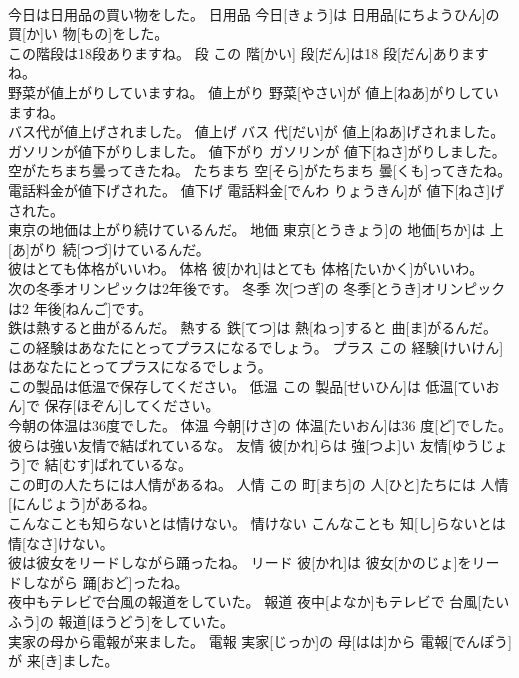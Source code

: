\documentclass[8pt]{extreport}
\begin{document}
\begin{CJK}{UTF8}{min}
\\	今日は日用品の買い物をした。	日用品	今日[きょう]は 日用品[にちようひん]の 買[か]い 物[もの]をした。	
\\	この階段は18段ありますね。	段	この 階[かい] 段[だん]は18 段[だん]ありますね。	
\\	野菜が値上がりしていますね。	値上がり	野菜[やさい]が 値上[ねあ]がりしていますね。	
\\	バス代が値上げされました。	値上げ	バス 代[だい]が 値上[ねあ]げされました。	
\\	ガソリンが値下がりしました。	値下がり	ガソリンが 値下[ねさ]がりしました。	
\\	空がたちまち曇ってきたね。	たちまち	空[そら]がたちまち 曇[くも]ってきたね。	
\\	電話料金が値下げされた。	値下げ	電話料金[でんわ りょうきん]が 値下[ねさ]げされた。	
\\	東京の地価は上がり続けているんだ。	地価	東京[とうきょう]の 地価[ちか]は 上[あ]がり 続[つづ]けているんだ。	
\\	彼はとても体格がいいわ。	体格	彼[かれ]はとても 体格[たいかく]がいいわ。	
\\	次の冬季オリンピックは2年後です。	冬季	次[つぎ]の 冬季[とうき]オリンピックは2 年後[ねんご]です。	
\\	鉄は熱すると曲がるんだ。	熱する	鉄[てつ]は 熱[ねっ]すると 曲[ま]がるんだ。	
\\	この経験はあなたにとってプラスになるでしょう。	プラス	この 経験[けいけん]はあなたにとってプラスになるでしょう。	
\\	この製品は低温で保存してください。	低温	この 製品[せいひん]は 低温[ていおん]で 保存[ほぞん]してください。	
\\	今朝の体温は36度でした。	体温	今朝[けさ]の 体温[たいおん]は36 度[ど]でした。	
\\	彼らは強い友情で結ばれているな。	友情	彼[かれ]らは 強[つよ]い 友情[ゆうじょう]で 結[むす]ばれているな。	
\\	この町の人たちには人情があるね。	人情	この 町[まち]の 人[ひと]たちには 人情[にんじょう]があるね。	
\\	こんなことも知らないとは情けない。	情けない	こんなことも 知[し]らないとは 情[なさ]けない。	
\\	彼は彼女をリードしながら踊ったね。	リード	彼[かれ]は 彼女[かのじょ]をリードしながら 踊[おど]ったね。	
\\	夜中もテレビで台風の報道をしていた。	報道	夜中[よなか]もテレビで 台風[たいふう]の 報道[ほうどう]をしていた。	
\\	実家の母から電報が来ました。	電報	実家[じっか]の 母[はは]から 電報[でんぽう]が 来[き]ました。	

\end{CJK}
\end{document}
